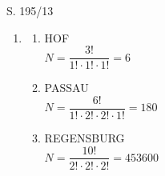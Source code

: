 \begin{Exercise}{S. 195/13}{}
\begin{enumerate}[leftmargin=*]
    \item [13.]{
        \begin{enumerate}[label=\alph*),leftmargin=*]
            \item[a)] {
                HOF\\[0.5ex]
                $N = \dfrac{3!}{1! \cdot 1! \cdot 1!} = 6$\\
                }
            \item[b)] {
                PASSAU\\[0.5ex]
                $N = \dfrac{6!}{1! \cdot 2! \cdot 2! \cdot 1!} = 180$\\
                }
            \item[c)] {
                REGENSBURG\\[0.5ex]
                $N = \dfrac{10!}{2! \cdot 2! \cdot 2!} = 453600$\\
                }
        \end{enumerate}
        }
\end{enumerate}
\end{Exercise}